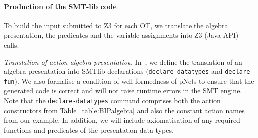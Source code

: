 \documentclass[smallcondensed]{svjour3}
\newcommand{\noteSB}[2][color=green!40, size=\tiny]{\todo[#1]{{\bf
      Note: } {#2}}}
\begin{document}

\paragraph{Production of the SMT-lib code}
  To build the input submitted to Z3 for each OT,
we translate the algebra presentation, the predicates and the
variable assignments into Z3 (Java-API) calls.

\emph{Translation of action algebra presentation.}
In~\cite{AVOCS18}, we  define the translation of an algebra presentation into
SMTlib declarations (\texttt{declare-datatypes} and
\texttt{declare-fun}). We also formalise a condition of well-formedness of pNets to ensure that the generated code is correct
and will not raise runtime errors in the SMT engine. Note that the
\texttt{declare-datatypes} command comprises both the action
constructors from Table~\ref{table:BIPalgebra} and also the constant action
names from our example.
In addition, we will include axiomatisation of any required functions
and predicates of the presentation data-types.


\end{document}
